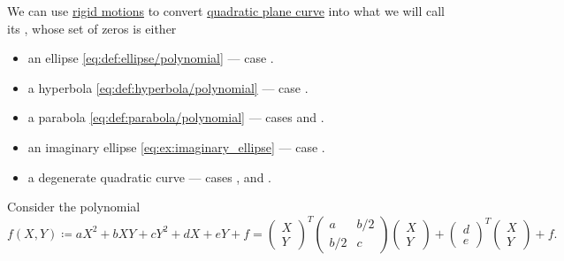 \begin{algorithm}\label{alg:canonization_of_quadratic_plane_curves}
  We can use \hyperref[def:rigid_motion]{rigid motions} to convert \hyperref[def:quadratic_plane_curve]{quadratic plane curve} into what we will call its , whose set of zeros is either
  \begin{itemize}
    \item an ellipse \eqref{eq:def:ellipse/polynomial} --- case .
    \item a hyperbola \eqref{eq:def:hyperbola/polynomial} --- case .
    \item a parabola \eqref{eq:def:parabola/polynomial} --- cases  and .
    \item an imaginary ellipse \eqref{eq:ex:imaginary_ellipse} --- case .
    \item a degenerate quadratic curve --- cases ,
   and .
  \end{itemize}

  Consider the polynomial
  \begin{equation*}
    f(X, Y)
    \coloneqq
    a X^2 + b XY + c Y^2 + d X + e Y + f
    =
    \begin{pmatrix}
      X \\ Y
    \end{pmatrix}^T
    \begin{pmatrix}
      a          & b / 2 \\
      b / 2 & c
    \end{pmatrix}
    \begin{pmatrix}
      X \\ Y
    \end{pmatrix}
    +
    \begin{pmatrix}
      d \\ e
    \end{pmatrix}^T
    \begin{pmatrix}
      X \\ Y
    \end{pmatrix}
    +
    f.
  \end{equation*}


\end{algorithm}
